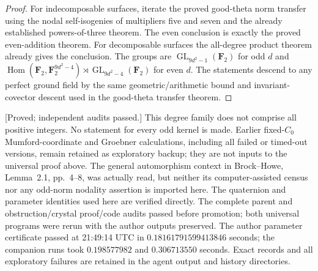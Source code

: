 \begin{proof}
For indecomposable surfaces, iterate the proved good-theta norm
transfer using the nodal self-isogenies of multipliers five and
seven and the already established powers-of-three theorem.
The even conclusion is exactly the proved even-addition theorem.
For decomposable surfaces the all-degree product theorem already
gives the conclusion. The groups are $\operatorname{GL}_{9d^2-1}
(\mathbf F_2)$ for odd $d$ and
$\operatorname{Hom}(\mathbf F_2,\mathbf F_2^{9d^2-4})\rtimes
\operatorname{GL}_{9d^2-4}(\mathbf F_2)$ for even $d$.
The statements descend to any perfect ground field by the same
geometric/arithmetic bound and invariant-covector descent used
in the good-theta transfer theorem.
\end{proof}

\begin{remark}
\label{rem:uniform-seven-scope-candidate}
\textup{[Proved; independent audits passed.]}
This degree family does not comprise all positive integers.
No statement for every odd kernel is made. Earlier fixed-$C_0$
Mumford-coordinate and Groebner calculations, including all failed
or timed-out versions, remain retained as exploratory backup;
they are not inputs to the universal proof above. The general
automorphism context in Brock--Howe, Lemma~2.1, pp.~4--8, was
actually read, but neither its computer-assisted census nor any
odd-norm nodality assertion is imported here. The quaternion and
parameter identities used here are verified directly. The complete parent and obstruction/crystal proof/code audits passed before promotion; both universal programs were rerun with the author outputs preserved. The author parameter certificate passed at 21:49:14 UTC in $0.18161791599413846$ seconds; the companion runs took $0.198577982$ and $0.306713550$ seconds. Exact records and all exploratory failures are retained in the agent output and history directories.
\end{remark}
